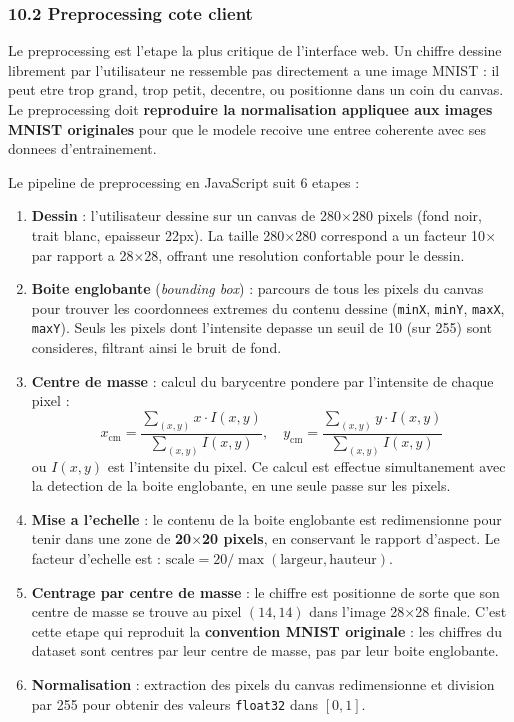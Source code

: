 \documentclass[
  letterpaper,
  DIV=11,
  numbers=noendperiod]{scrartcl}
\begin{document}
\subsubsection{10.2 Preprocessing cote client}\label{preprocessing-client}

Le preprocessing est l'etape la plus critique de l'interface web. Un chiffre dessine librement par l'utilisateur ne ressemble pas directement a une image MNIST : il peut etre trop grand, trop petit, decentre, ou positionne dans un coin du canvas. Le preprocessing doit \textbf{reproduire la normalisation appliquee aux images MNIST originales} pour que le modele recoive une entree coherente avec ses donnees d'entrainement.

Le pipeline de preprocessing en JavaScript suit 6 etapes :

\begin{enumerate}
\def\labelenumi{\arabic{enumi}.}
\item \textbf{Dessin} : l'utilisateur dessine sur un canvas de 280$\times$280 pixels (fond noir, trait blanc, epaisseur 22px). La taille 280$\times$280 correspond a un facteur 10$\times$ par rapport a 28$\times$28, offrant une resolution confortable pour le dessin.

\item \textbf{Boite englobante} (\emph{bounding box}) : parcours de tous les pixels du canvas pour trouver les coordonnees extremes du contenu dessine (\texttt{minX}, \texttt{minY}, \texttt{maxX}, \texttt{maxY}). Seuls les pixels dont l'intensite depasse un seuil de 10 (sur 255) sont consideres, filtrant ainsi le bruit de fond.

\item \textbf{Centre de masse} : calcul du barycentre pondere par l'intensite de chaque pixel :
\[x_{\text{cm}} = \frac{\sum_{(x,y)} x \cdot I(x,y)}{\sum_{(x,y)} I(x,y)}, \quad y_{\text{cm}} = \frac{\sum_{(x,y)} y \cdot I(x,y)}{\sum_{(x,y)} I(x,y)}\]
ou \(I(x,y)\) est l'intensite du pixel. Ce calcul est effectue simultanement avec la detection de la boite englobante, en une seule passe sur les pixels.

\item \textbf{Mise a l'echelle} : le contenu de la boite englobante est redimensionne pour tenir dans une zone de \textbf{20$\times$20 pixels}, en conservant le rapport d'aspect. Le facteur d'echelle est : \(\text{scale} = 20 / \max(\text{largeur}, \text{hauteur})\).

\item \textbf{Centrage par centre de masse} : le chiffre est positionne de sorte que son centre de masse se trouve au pixel \((14, 14)\) dans l'image 28$\times$28 finale. C'est cette etape qui reproduit la \textbf{convention MNIST originale} : les chiffres du dataset sont centres par leur centre de masse, pas par leur boite englobante.

\item \textbf{Normalisation} : extraction des pixels du canvas redimensionne et division par 255 pour obtenir des valeurs \texttt{float32} dans \([0, 1]\).
\end{enumerate}
\end{document}
